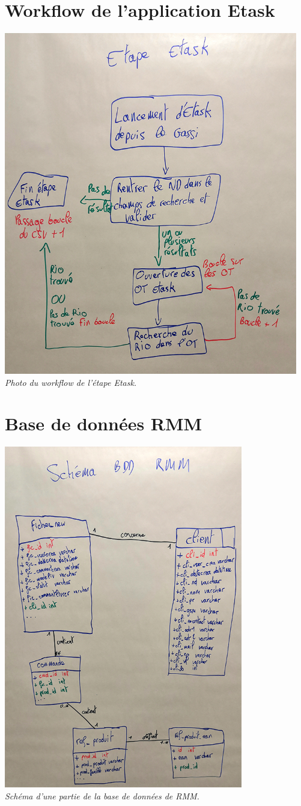 \documentclass[a4paper,twoside,12pt,openright]{report}
\begin{document}
\chapter{Workflow de l'application Etask}
\begin{center}
\includegraphics[height=15cm]{workflowEtask.jpg}\\
\itshape Photo du workflow de l'étape Etask.
\end{center}
\chapter{Base de données RMM}
\begin{center}
\includegraphics[height=15cm]{schemaBDD_RMM.jpg}\\
\itshape Schéma d'une partie de la base de données de RMM.
\end{center}
\end{document}
